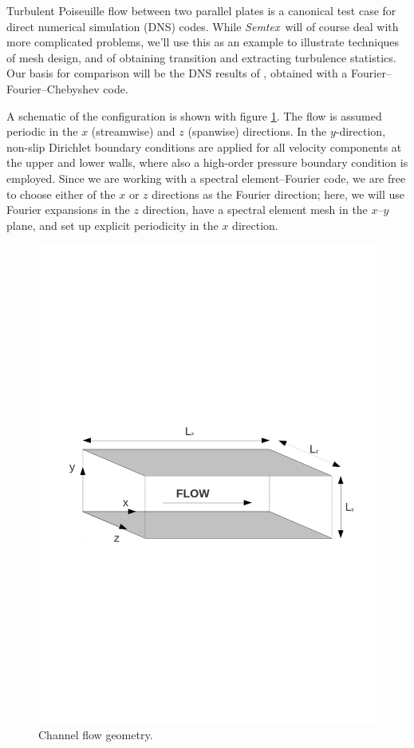 \documentclass[11pt]{report}
\newcommand{\Semtex}{\emph{Semtex}} \newcommand{\Dog}{\emph{Dog}}
\begin{document}

Turbulent Poiseuille flow between two parallel plates is a canonical
test case for direct numerical simulation (DNS) codes.  While
\Semtex\ will of course deal with more complicated problems, we'll use
this as an example to illustrate techniques of mesh design, and of
obtaining transition and extracting turbulence statistics.  Our basis
for comparison will be the DNS results of \citet*{kmm87}, obtained
with a Fourier--Fourier--Chebyshev code.

A schematic of the configuration is shown with figure
\ref{pic:configuration}. The flow is assumed periodic in the $x$
(streamwise) and $z$ (spanwise) directions.  In the $y$-direction,
non-slip Dirichlet boundary conditions are applied for all velocity
components at the upper and lower walls, where also a high-order
pressure boundary condition \citep[of computed Neumann type,
  see][]{kio91} is employed. Since we are working with a spectral
element--Fourier code, we are free to choose either of the $x$ or $z$
directions as the Fourier direction; here, we will use Fourier
expansions in the $z$ direction, have a spectral element mesh in the
$x$--$y$ plane, and set up explicit periodicity in the $x$ direction.
\begin{figure}[h]
\centering
\includegraphics[width=0.8\linewidth]{dns_config}
\caption{Channel flow geometry.}
\label{pic:configuration}
\end{figure}
\end{document}
